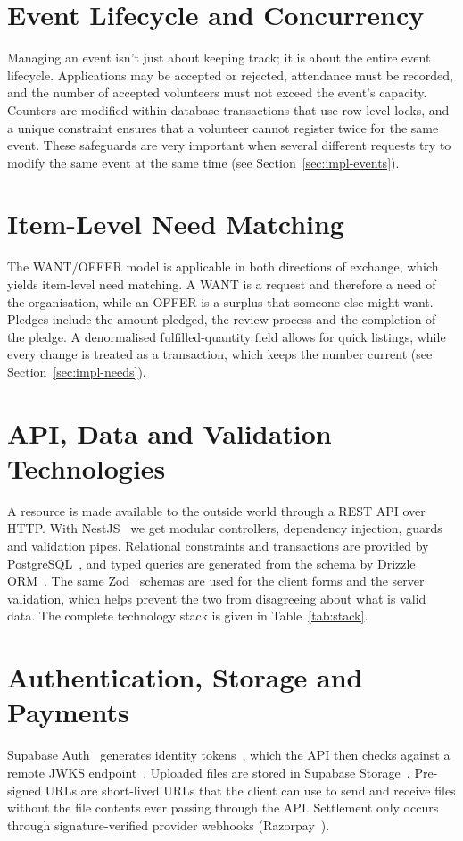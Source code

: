 \section{Event Lifecycle and Concurrency}
Managing an event isn't just about keeping track; it is about the entire event lifecycle. Applications may be accepted or rejected, attendance must be recorded, and the number of accepted volunteers must not exceed the event's capacity. Counters are modified within database transactions that use row-level locks, and a unique constraint ensures that a volunteer cannot register twice for the same event. These safeguards are very important when several different requests try to modify the same event at the same time (see Section~\ref{sec:impl-events}).

\section{Item-Level Need Matching}
The WANT/OFFER model is applicable in both directions of exchange, which yields item-level need matching. A WANT is a request and therefore a need of the organisation, while an OFFER is a surplus that someone else might want. Pledges include the amount pledged, the review process and the completion of the pledge. A denormalised fulfilled-quantity field allows for quick listings, while every change is treated as a transaction, which keeps the number current (see Section~\ref{sec:impl-needs}).

\section{API, Data and Validation Technologies}
A resource is made available to the outside world through a REST API over HTTP. With NestJS~\cite{nestjs} we get modular controllers, dependency injection, guards and validation pipes. Relational constraints and transactions are provided by PostgreSQL~\cite{postgresql}, and typed queries are generated from the schema by Drizzle ORM~\cite{drizzle}. The same Zod~\cite{zod} schemas are used for the client forms and the server validation, which helps prevent the two from disagreeing about what is valid data. The complete technology stack is given in Table~\ref{tab:stack}.

\section{Authentication, Storage and Payments}
Supabase Auth~\cite{supabase} generates identity tokens~\cite{jwt}, which the API then checks against a remote JWKS endpoint~\cite{jwk}. Uploaded files are stored in Supabase Storage~\cite{supabase}. Pre-signed URLs are short-lived URLs that the client can use to send and receive files without the file contents ever passing through the API. Settlement only occurs through signature-verified provider webhooks (Razorpay~\cite{razorpay}).

